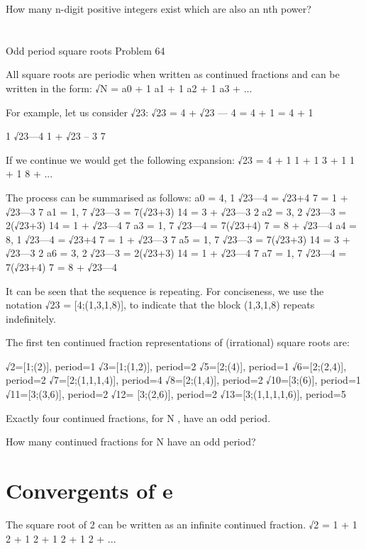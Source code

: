 How many n-digit positive integers exist which are also an nth power?

\section{} \label{pb.064}
Odd period square roots
Problem 64

All square roots are periodic when written as continued fractions and can be written in the form:
√N = a0 + 	
1
  	a1 + 	
1
  	  	a2 + 	
1
  	  	  	a3 + ...

For example, let us consider √23:
√23 = 4 + √23 — 4 = 4 +  	
1
	 = 4 +  	
1
  	
1
√23—4
	  	1 +  	
√23 – 3
7

If we continue we would get the following expansion:
√23 = 4 + 	
1
  	1 + 	
1
  	  	3 + 	
1
  	  	  	1 + 	
1
  	  	  	  	8 + ...

The process can be summarised as follows:
a0 = 4, 	  	
1
√23—4
	 =  	
√23+4
7
	 = 1 +  	
√23—3
7
a1 = 1, 	  	
7
√23—3
	 =  	
7(√23+3)
14
	 = 3 +  	
√23—3
2
a2 = 3, 	  	
2
√23—3
	 =  	
2(√23+3)
14
	 = 1 +  	
√23—4
7
a3 = 1, 	  	
7
√23—4
	 =  	
7(√23+4)
7
	 = 8 +  	√23—4
a4 = 8, 	  	
1
√23—4
	 =  	
√23+4
7
	 = 1 +  	
√23—3
7
a5 = 1, 	  	
7
√23—3
	 =  	
7(√23+3)
14
	 = 3 +  	
√23—3
2
a6 = 3, 	  	
2
√23—3
	 =  	
2(√23+3)
14
	 = 1 +  	
√23—4
7
a7 = 1, 	  	
7
√23—4
	 =  	
7(√23+4)
7
	 = 8 +  	√23—4

It can be seen that the sequence is repeating. For conciseness, we use the notation √23 = [4;(1,3,1,8)], to indicate that the block (1,3,1,8) repeats indefinitely.

The first ten continued fraction representations of (irrational) square roots are:

√2=[1;(2)], period=1
√3=[1;(1,2)], period=2
√5=[2;(4)], period=1
√6=[2;(2,4)], period=2
√7=[2;(1,1,1,4)], period=4
√8=[2;(1,4)], period=2
√10=[3;(6)], period=1
√11=[3;(3,6)], period=2
√12= [3;(2,6)], period=2
√13=[3;(1,1,1,1,6)], period=5

Exactly four continued fractions, for N  , have an odd period.

How many continued fractions for N   have an odd period?

\section{Convergents of e} \label{pb.065}

The square root of 2 can be written as an infinite continued fraction.
√2 = 1 + 	
1
  	2 + 	
1
  	  	2 + 	
1
  	  	  	2 + 	
1
  	  	  	  	2 + ...

